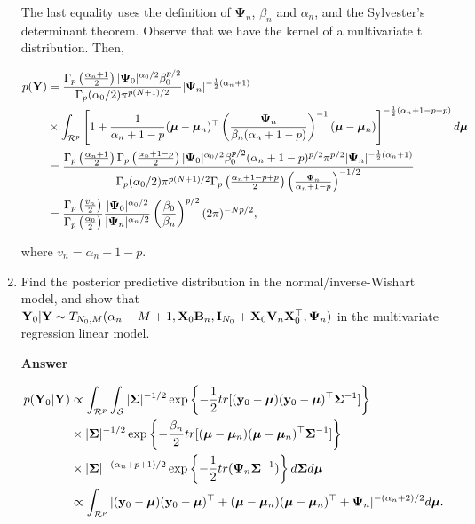 \begin{enumerate}[leftmargin=*]
The last equality uses the definition of $\mathbf{\Psi}_n$, $\beta_n$ and $\alpha_n$, and the Sylvester's determinant theorem. Observe that we have the kernel of a multivariate t distribution. Then,

\begin{align*}
	p({\bf{Y}})	&=\frac{\Gamma_p\left(\frac{\alpha_n+1}{2}\right)|\mathbf{\Psi}_0|^{\alpha_0/2}\beta_0^{p/2}}{\Gamma_p(\alpha_0/2)\pi^{p(N+1)/2}}|\mathbf{\Psi}_n|^{-\frac{1}{2}(\alpha_n+1)}\\
	&\times\int_{\mathcal{R}^p} \left[ 1+\frac{1}{\alpha_n+1-p}(\bm{\mu}-\bm{\mu}_n)^{\top}\left(\frac{\mathbf{\Psi}_n}{\beta_n(\alpha_n+1-p)}\right)^{-1}(\bm{\mu}-\bm{\mu}_n)\right]^{-\frac{1}{2}(\alpha_n+1-p+p)} d\bm{\mu}\\
	&=\frac{\Gamma_p\left(\frac{\alpha_n+1}{2}\right)\Gamma_p\left(\frac{\alpha_n+1-p}{2}\right)|\mathbf{\Psi}_0|^{\alpha_0/2}\beta_0^{p/2}(\alpha_n+1-p)^{p/2}\pi^{p/2}|\mathbf{\Psi}_n|^{-\frac{1}{2}(\alpha_n+1)}}{\Gamma_p(\alpha_0/2)\pi^{p(N+1)/2}\Gamma_p\left(\frac{\alpha_n+1-p+p}{2}\right)\left(\frac{\mathbf{\Psi}_n}{\alpha_n+1-p}\right)^{-1/2}}\\
	&=\frac{\Gamma_p\left(\frac{v_n}{2}\right)}{\Gamma_p\left(\frac{\alpha_0}{2}\right)}\frac{|\mathbf{\Psi}_0|^{\alpha_0/2}}{|\mathbf{\Psi}_n|^{\alpha_n/2}}\left(\frac{\beta_0}{\beta_n}\right)^{p/2}(2\pi)^{-Np/2},
\end{align*}

where $v_n=\alpha_n+1-p$.


\item Find the posterior predictive distribution in the normal/inverse-Wishart model, and show that ${\bf{Y}}_0|{\bf{Y}}\sim T_{N_0,M}(\alpha_n-M+1,{\bf{X}}_0{\bf{B}}_n,{\bf{I}}_{N_0}+{\bf{X}}_0{\bf{V}}_n{\bf{X}}_0^{\top},{\bf{\Psi}}_n)$ in the multivariate regression linear model.

\textbf{Answer}

\begin{align*}
	p({\bf{Y}}_0|{\bf{Y}})&\propto\int_{\mathcal{R}^p}\int_{\mathcal{S}}|\mathbf{\Sigma}|^{-1/2}\exp\left\{-\frac{1}{2}tr[({\bf{y}}_0-\bm{\mu})({\bf{y}}_0-\bm{\mu})^{\top}\mathbf{\Sigma}^{-1}]\right\}\\
	&\times |\mathbf{\Sigma}|^{-1/2}\exp\left\{-\frac{\beta_n}{2}tr[(\bm{\mu}-\bm{\mu}_n)(\bm{\mu}-\bm{\mu}_n)^{\top}\mathbf{\Sigma}^{-1}]\right\}\\
	&\times |\mathbf{\Sigma}|^{-(\alpha_n+p+1)/2}\exp\left\{-\frac{1}{2}tr(\mathbf{\Psi}_n \mathbf{\Sigma}^{-1})\right\}d\mathbf{\Sigma} d\bm{\mu}\\
	&\propto\int_{\mathcal{R}^p}|({\bf{y}}_0-\bm{\mu})({\bf{y}}_0-\bm{\mu})^{\top}+(\bm{\mu}-\bm{\mu}_n)(\bm{\mu}-\bm{\mu}_n)^{\top}+\mathbf{\Psi}_n|^{-(\alpha_n+2)/2}d\bm{\mu}.
\end{align*}


\end{enumerate}
